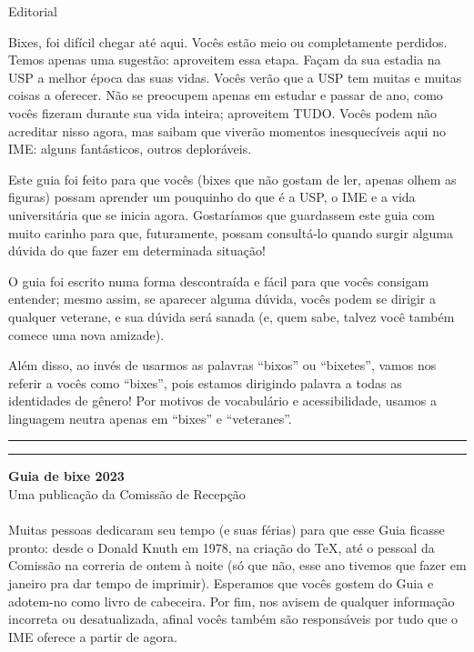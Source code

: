 \begin{editorial}{Editorial}

Bixes, foi difícil chegar até aqui. Vocês
estão meio ou completamente perdidos. Temos apenas uma sugestão: aproveitem essa
etapa. Façam da sua estadia na USP a melhor época das suas vidas. Vocês verão
que a USP tem muitas e muitas coisas a oferecer. Não se preocupem apenas em
estudar e passar de ano, como vocês fizeram durante sua vida inteira; aproveitem
TUDO. Vocês podem não acreditar nisso agora, mas saibam que viverão momentos
inesquecíveis aqui no IME: alguns fantásticos, outros deploráveis.

Este guia foi feito para que vocês (bixes que não gostam de ler, apenas olhem as figuras)
possam aprender um pouquinho do que é a USP,
o IME e a vida universitária que se inicia agora. 
Gostaríamos que guardassem este guia com muito carinho para que, futuramente, possam consultá-lo
quando surgir alguma dúvida do que fazer em determinada situação!

O guia foi escrito numa forma
descontraída e fácil para que vocês consigam entender; mesmo assim, se aparecer
alguma dúvida, vocês podem se dirigir a qualquer veterane, e sua dúvida será
sanada (e, quem sabe, talvez você também comece uma nova amizade).

Além disso, ao invés de usarmos as palavras ``bixos'' ou ``bixetes'', vamos nos referir
a vocês como ``bixes'', pois estamos dirigindo palavra a todas as identidades de 
gênero! Por motivos de vocabulário e acessibilidade, usamos a linguagem neutra 
apenas em ``bixes'' e ``veteranes''.


\rule{\textwidth}{0.5ex}\rule{2ex}{0.5ex}

{\large\bf Guia de bixe 2023} \\
Uma publicação da Comissão de Recepção

\paragraph{}
Muitas pessoas dedicaram seu tempo (e suas férias) para que esse Guia ficasse
pronto: desde o Donald Knuth em 1978, na criação do \TeX\makebox{}, até o
pessoal da Comissão na correria de ontem à noite (só que não, esse ano tivemos que 
fazer em janeiro pra dar tempo de imprimir). Esperamos que vocês gostem do Guia
e adotem-no como livro de cabeceira. Por fim, nos avisem de qualquer informação
incorreta ou desatualizada, afinal vocês também são responsáveis por tudo que o
IME oferece a partir de agora.


\end{editorial}
